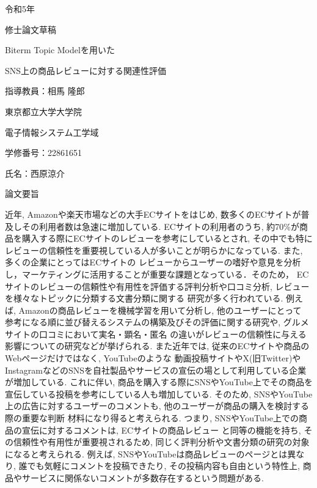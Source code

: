 \documentclass{ltjarticle}
\begin{document}
\begin{titlepage}
    \begin{center}
        {\Large 令和5年}
        \vspace{10truept}

        {\Large 修士論文草稿}
        \vspace*{180truept}

        {\Huge Biterm Topic Modelを用いた}\par
        {\Huge SNS上の商品レビューに対する関連性評価}
        \vspace{160truept}

        {\Large 指導教員：相馬 隆郎}
        \vspace{30truept}

        {\Large 東京都立大学大学院}
        \vspace{10truept}

        {\Large 電子情報システム工学域}
        \vspace{30truept}

        {\Large 学修番号：22861651}
        \vspace{10truept}
        
        {\Large 氏名：西原涼介}
    \end{center}
\end{titlepage}
\noindent
{\LARGE 論文要旨}
\vspace{20truept}

近年, Amazonや楽天市場などの大手ECサイトをはじめ, 数多くのECサイトが普及しその利用者数は急速に増加している. 
ECサイトの利用者のうち, 約70\%が商品を購入する際にECサイトのレビューを参考にしているとされ, 
その中でも特にレビューの信頼性を重要視している人が多いことが明らかになっている. また, 多くの企業にとってはECサイトの
レビューからユーザーの嗜好や意見を分析し，マーケティングに活用することが重要な課題となっている．そのため，
ECサイトのレビューの信頼性や有用性を評価する評判分析や口コミ分析, レビューを様々なトピックに分類する文書分類に関する
研究が多く行われている. 例えば, Amazonの商品レビューを機械学習を用いて分析し, 他のユーザーにとって
参考になる順に並び替えるシステムの構築及びその評価に関する研究や, グルメサイトの口コミにおいて実名・顕名・匿名
の違いがレビューの信頼性に与える影響についての研究などが挙げられる. 
また近年では, 従来のECサイトや商品のWebページだけではなく, YouTubeのような
動画投稿サイトやX(旧Twitter)やInstagramなどのSNSを自社製品やサービスの宣伝の場として利用している企業が増加している. 
これに伴い, 商品を購入する際にSNSやYouTube上でその商品を宣伝している投稿を参考にしている人も増加している. 
そのため, SNSやYouTube上の広告に対するユーザーのコメントも, 他のユーザーが商品の購入を検討する際の重要な判断
材料になり得ると考えられる. つまり, SNSやYouTube上での商品の宣伝に対するコメントは, ECサイトの商品レビュー
と同等の機能を持ち, その信頼性や有用性が重要視されるため, 同じく評判分析や文書分類の研究の対象になると考えられる. 
例えば, SNSやYouTubeは商品レビューのページとは異なり, 誰でも気軽にコメントを投稿できたり, その投稿内容も自由という特性上, 
商品やサービスに関係ないコメントが多数存在するという問題がある.
\end{document}
